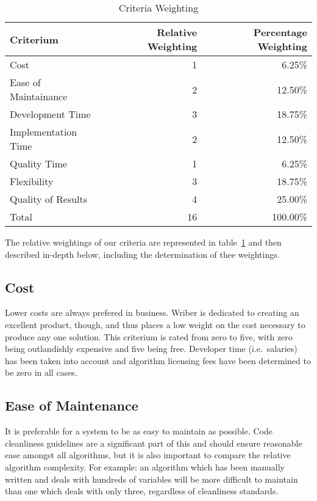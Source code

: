 \documentclass[12pt]{article}
\begin{document}
\begin{table}[ht]
\caption{Criteria Weighting}
\label{tbl:weighting}
\centering
\begin{tabular}{|l|r|r|}
	\hline
	Criterium & Relative Weighting & Percentage Weighting \\
	\hline
	\hline
	Cost                 &  1 &   6.25\% \\
	Ease of Maintainance &  2 &  12.50\% \\
	Development Time     &  3 &  18.75\% \\
	Implementation Time  &  2 &  12.50\% \\
	Quality Time         &  1 &   6.25\% \\
	Flexibility          &  3 &  18.75\% \\
	Quality of Results   &  4 &  25.00\% \\
	\hline
	\hline
	Total                & 16 & 100.00\% \\
	\hline
\end{tabular}
\end{table}

The relative weightings of our criteria are represented in table~\ref{tbl:weighting} and then described in-depth below, including the determination of thee weightings.

\subsection{Cost}
Lower costs are always prefered in business. Wriber is dedicated to creating an excellent product, though, and thus places a low weight on the cost necessary to produce any one solution. This criterium is rated from zero to five, with zero being outlandishly expensive and five being free. Developer time (i.e.\ salaries) has been taken into account and algorithm licensing fees have been determined to be zero in all cases.

\subsection{Ease of Maintenance}
It is preferable for a system to be as easy to maintain as possible. Code cleanliness guidelines are a significant part of this and should ensure reasonable ease amongst all algorithms, but it is also important to compare the relative algorithm complexity. For example: an algorithm which has been manually written and deals with hundreds of variables will be more difficult to maintain than one which deals with only three, regardless of cleanliness standards.
\end{document}
